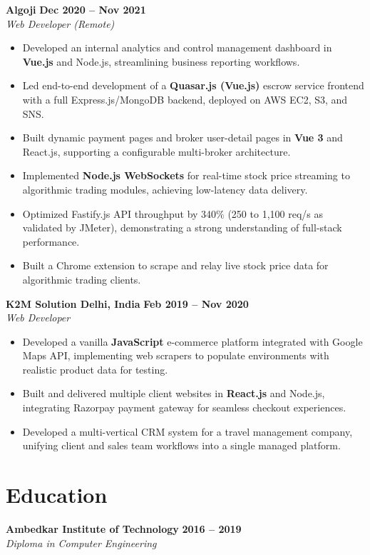 \documentclass[a4paper,10pt]{article}
\begin{document}
\vspace{1ex}
\noindent
\textbf{Algoji} \hfill \textbf{Dec 2020 -- Nov 2021} \\
\textit{Web Developer (Remote)}
\begin{itemize}[leftmargin=*,itemsep=2pt,parsep=0pt]
    \item Developed an internal analytics and control management dashboard in \textbf{Vue.js} and Node.js, streamlining business reporting workflows.
    \item Led end-to-end development of a \textbf{Quasar.js (Vue.js)} escrow service frontend with a full Express.js/MongoDB backend, deployed on AWS EC2, S3, and SNS.
    \item Built dynamic payment pages and broker user-detail pages in \textbf{Vue 3} and React.js, supporting a configurable multi-broker architecture.
    \item Implemented \textbf{Node.js WebSockets} for real-time stock price streaming to algorithmic trading modules, achieving low-latency data delivery.
    \item Optimized Fastify.js API throughput by 340\% (250 to 1,100 req/s as validated by JMeter), demonstrating a strong understanding of full-stack performance.
    \item Built a Chrome extension to scrape and relay live stock price data for algorithmic trading clients.
\end{itemize}

\vspace{1ex}
\noindent
\textbf{K2M Solution \textbar{} Delhi, India} \hfill \textbf{Feb 2019 -- Nov 2020} \\
\textit{Web Developer}
\begin{itemize}[leftmargin=*,itemsep=2pt,parsep=0pt]
    \item Developed a vanilla \textbf{JavaScript} e-commerce platform integrated with Google Maps API, implementing web scrapers to populate environments with realistic product data for testing.
    \item Built and delivered multiple client websites in \textbf{React.js} and Node.js, integrating Razorpay payment gateway for seamless checkout experiences.
    \item Developed a multi-vertical CRM system for a travel management company, unifying client and sales team workflows into a single managed platform.
\end{itemize}

\section*{Education}
\noindent
\textbf{Ambedkar Institute of Technology} \hfill \textbf{2016 -- 2019} \\
\textit{Diploma in Computer Engineering}
\end{document}
